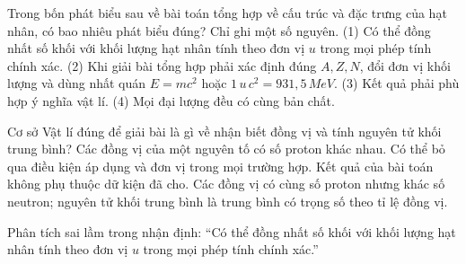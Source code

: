 \begin{ex}
Trong bốn phát biểu sau về bài toán tổng hợp về cấu trúc và đặc trưng của hạt nhân, có bao nhiêu phát biểu đúng? Chỉ ghi một số nguyên. (1) Có thể đồng nhất số khối với khối lượng hạt nhân tính theo đơn vị $u$ trong mọi phép tính chính xác. (2) Khi giải bài tổng hợp phải xác định đúng $A,Z,N$, đổi đơn vị khối lượng và dùng nhất quán $E=mc^2$ hoặc $1\,u\,c^2=931,5\,MeV$. (3) Kết quả phải phù hợp ý nghĩa vật lí. (4) Mọi đại lượng đều có cùng bản chất.
\end{ex}

\begin{ex}
Cơ sở Vật lí đúng để giải bài là gì về nhận biết đồng vị và tính nguyên tử khối trung bình?
\choice
{Các đồng vị của một nguyên tố có số proton khác nhau.}
{Có thể bỏ qua điều kiện áp dụng và đơn vị trong mọi trường hợp.}
{Kết quả của bài toán không phụ thuộc dữ kiện đã cho.}
{\True Các đồng vị có cùng số proton nhưng khác số neutron; nguyên tử khối trung bình là trung bình có trọng số theo tỉ lệ đồng vị.}
\end{ex}

\begin{bt}
Phân tích sai lầm trong nhận định: “Có thể đồng nhất số khối với khối lượng hạt nhân tính theo đơn vị $u$ trong mọi phép tính chính xác.”
\end{bt}


